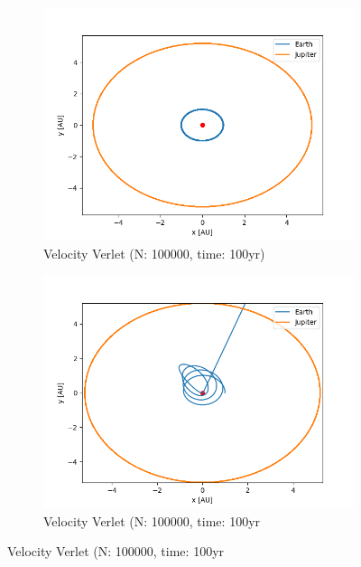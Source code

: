 \documentclass{article}
\begin{document}
\begin{figure}[H]
  \centering
  \begin{subfigure}{0.5\textwidth}
    \centering
    \includegraphics[width=1.0\textwidth]{plots/jupiter_m0p01.png}
    \caption{Velocity Verlet (N: 100000, time: 100yr)}
  \end{subfigure}%
    \begin{subfigure}{0.5\textwidth}
    \centering
    \includegraphics[width=1.0\textwidth]{plots/jupiter_m1p0.png}
    \caption{Velocity Verlet (N: 100000, time: 100yr}  
  \end{subfigure}
\end{figure}
\end{document}
